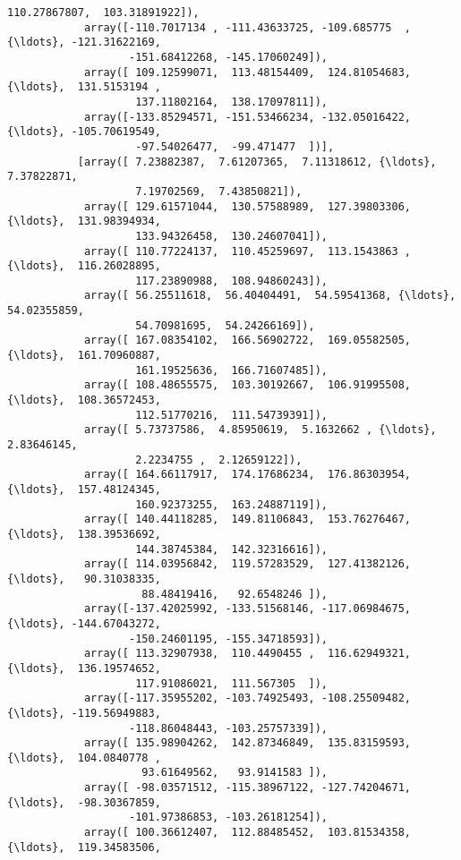 \documentclass[11pt]{article}
\begin{document}
\begin{Verbatim}[commandchars=\\\{\}]
                    110.27867807,  103.31891922]),
            array([-110.7017134 , -111.43633725, -109.685775  , {\ldots}, -121.31622169,
                   -151.68412268, -145.17060249]),
            array([ 109.12599071,  113.48154409,  124.81054683, {\ldots},  131.5153194 ,
                    137.11802164,  138.17097811]),
            array([-133.85294571, -151.53466234, -132.05016422, {\ldots}, -105.70619549,
                    -97.54026477,  -99.471477  ])],
           [array([ 7.23882387,  7.61207365,  7.11318612, {\ldots},  7.37822871,
                    7.19702569,  7.43850821]),
            array([ 129.61571044,  130.57588989,  127.39803306, {\ldots},  131.98394934,
                    133.94326458,  130.24607041]),
            array([ 110.77224137,  110.45259697,  113.1543863 , {\ldots},  116.26028895,
                    117.23890988,  108.94860243]),
            array([ 56.25511618,  56.40404491,  54.59541368, {\ldots},  54.02355859,
                    54.70981695,  54.24266169]),
            array([ 167.08354102,  166.56902722,  169.05582505, {\ldots},  161.70960887,
                    161.19525636,  166.71607485]),
            array([ 108.48655575,  103.30192667,  106.91995508, {\ldots},  108.36572453,
                    112.51770216,  111.54739391]),
            array([ 5.73737586,  4.85950619,  5.1632662 , {\ldots},  2.83646145,
                    2.2234755 ,  2.12659122]),
            array([ 164.66117917,  174.17686234,  176.86303954, {\ldots},  157.48124345,
                    160.92373255,  163.24887119]),
            array([ 140.44118285,  149.81106843,  153.76276467, {\ldots},  138.39536692,
                    144.38745384,  142.32316616]),
            array([ 114.03956842,  119.57283529,  127.41382126, {\ldots},   90.31038335,
                     88.48419416,   92.6548246 ]),
            array([-137.42025992, -133.51568146, -117.06984675, {\ldots}, -144.67043272,
                   -150.24601195, -155.34718593]),
            array([ 113.32907938,  110.4490455 ,  116.62949321, {\ldots},  136.19574652,
                    117.91086021,  111.567305  ]),
            array([-117.35955202, -103.74925493, -108.25509482, {\ldots}, -119.56949883,
                   -118.86048443, -103.25757339]),
            array([ 135.98904262,  142.87346849,  135.83159593, {\ldots},  104.0840778 ,
                     93.61649562,   93.9141583 ]),
            array([ -98.03571512, -115.38967122, -127.74204671, {\ldots},  -98.30367859,
                   -101.97386853, -103.26181254]),
            array([ 100.36612407,  112.88485452,  103.81534358, {\ldots},  119.34583506,

\end{Verbatim}
\end{document}
